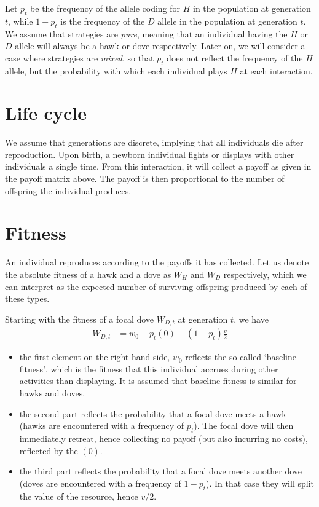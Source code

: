 \documentclass[
]{book}
\providecommand{\tightlist}{%
  \setlength{\itemsep}{0pt}\setlength{\parskip}{0pt}}
\begin{document}
Let \(p_{t}\) be the frequency of the allele coding for \(H\) in the population at generation \(t\), while \(1-p_{t}\) is the frequency of the \(D\) allele in the population at generation \(t\). We assume that strategies are \emph{pure}, meaning that an individual having the \(H\) or \(D\) allele will always be a hawk or dove respectively. Later on, we will consider a case where strategies are \emph{mixed}, so that \(p_{t}\) does not reflect the frequency of the \(H\) allele, but the probability with which each individual plays \(H\) at each interaction.

\hypertarget{life-cycle}{%
\section{Life cycle}\label{life-cycle}}

We assume that generations are discrete, implying that all individuals die after reproduction. Upon birth, a newborn individual fights or displays with other individuals a single time. From this interaction, it will collect a payoff as given in the payoff matrix above. The payoff is then proportional to the number of offspring the individual produces.

\hypertarget{fitness}{%
\section{Fitness}\label{fitness}}

An individual reproduces according to the payoffs it has collected. Let us denote the absolute fitness of a hawk and a dove as \(W_{H}\) and \(W_{D}\) respectively, which we can interpret as the expected number of surviving offspring produced by each of these types.

Starting with the fitness of a focal dove \(W_{D,t}\) at generation \(t\), we have
\begin{align}
W_{D,t} &= w_{0} + p_{t} (0) + \left(1-p_{t} \right) \frac{v}{2}
\end{align}

\begin{itemize}
\tightlist
\item
  the first element on the right-hand side, \(w_{0}\) reflects the so-called `baseline fitness', which is the fitness that this individual accrues during other activities than displaying. It is assumed that baseline fitness is similar for hawks and doves.
\item
  the second part reflects the probability that a focal dove meets a hawk (hawks are encountered with a frequency of \(p_{t}\)). The focal dove will then immediately retreat, hence collecting no payoff (but also incurring no costs), reflected by the \((0)\).
\item
  the third part reflects the probability that a focal dove meets another dove (doves are encountered with a frequency of \(1-p_{t}\)). In that case they will split the value of the resource, hence \(v/2\).
\end{itemize}
\end{document}

